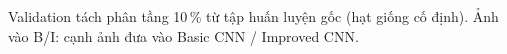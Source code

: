 Validation tách phân tầng 10\,\% từ tập huấn luyện gốc (hạt giống cố định). Ảnh vào B/I: cạnh ảnh đưa vào Basic CNN / Improved CNN.
